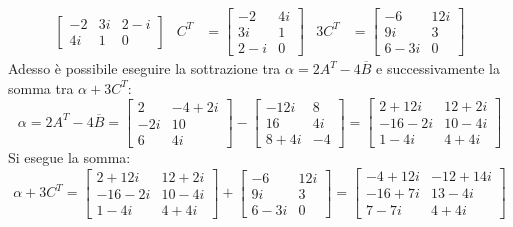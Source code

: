 \documentclass[a4paper]{article}
\begin{document}
\begin{equation*}
\begin{array}{lllllllll}
\begin{bmatrix}
				-2	& 3i	& 2-i	\\
				4i	& 1		& 0
			\end{bmatrix} &
			C^{T} & = \begin{bmatrix}
				-2	& 4i	\\
				3i	& 1		\\
				2-i	& 0
			\end{bmatrix} &
			3C^{T} & = \begin{bmatrix}
				-6	& 12i	\\
				9i	& 3		\\
				6-3i& 0
			\end{bmatrix}
		\end{array}
	\end{equation*}\newpage
	Adesso è possibile eseguire la sottrazione tra $\alpha = 2A^{T} - 4\overline{B}$ e successivamente la somma tra $\alpha + 3C^{T}$:
	\begin{equation*}
		\alpha = 2A^{T} - 4\overline{B} = \begin{bmatrix}
			2	& -4+2i	\\
			-2i	& 10	\\
			6	& 4i
		\end{bmatrix} - \begin{bmatrix}
			-12i	& 8		\\
			16		& 4i	\\
			8+4i	& -4
		\end{bmatrix} = \begin{bmatrix}
			2+12i	& 12+2i		\\
			-16-2i	& 10-4i		\\
			1-4i	& 4+4i
		\end{bmatrix}
	\end{equation*}
	Si esegue la somma:
	\begin{equation*}
		\alpha + 3C^{T} = \begin{bmatrix}
			2+12i	& 12+2i		\\
			-16-2i	& 10-4i		\\
			1-4i	& 4+4i
		\end{bmatrix} + \begin{bmatrix}
			-6	& 12i	\\
			9i	& 3		\\
			6-3i& 0
		\end{bmatrix} = \begin{bmatrix}
			-4+12i	& -12+14i	\\
			-16+7i	& 13-4i		\\
			7-7i	& 4+4i
		\end{bmatrix}
	\end{equation*}\newpage
\end{document}
